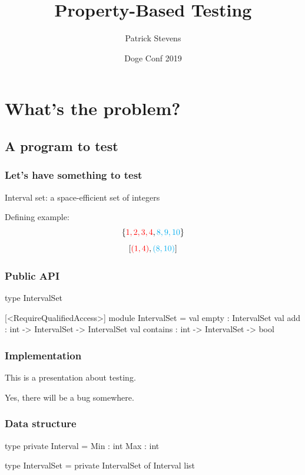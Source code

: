 \documentclass{beamer}
\title{Property-Based Testing}
\author{Patrick Stevens}
\institute{G-Research}
\date{Doge Conf 2019}
\begin{document}
\begin{frame}
\titlepage
\end{frame}

\section{What's the problem?}
\subsection{A program to test}

\begin{frame}
\tableofcontents
\end{frame}

\begin{frame}
\tableofcontents[currentsection]
\end{frame}

\begin{frame}
\frametitle{Let's have something to test}
Interval set: a space-efficient set of integers

Defining example:
$$\{{\color{red}1,2,3,4},{\color{cyan}8,9,10}\}$$ $$[{\color{red}(1, 4)}, {\color{cyan}(8, 10)}]$$
\end{frame}

\begin{frame}[fragile]
\frametitle{Public API}
\begin{fslisting}
type IntervalSet

[<RequireQualifiedAccess>]
module IntervalSet =
    val empty : IntervalSet
    val add : int -> IntervalSet -> IntervalSet
    val contains : int -> IntervalSet -> bool
\end{fslisting}

\end{frame}

\begin{frame}
\frametitle{Implementation}
This is a presentation about testing.

Yes, there will be a bug somewhere.
\end{frame}

\begin{frame}[fragile]
\frametitle{Data structure}

\begin{fslisting}
type private Interval =
    {
        Min : int
        Max : int
    }

type IntervalSet = private IntervalSet of Interval list

\end{fslisting}
\end{frame}
\end{document}
